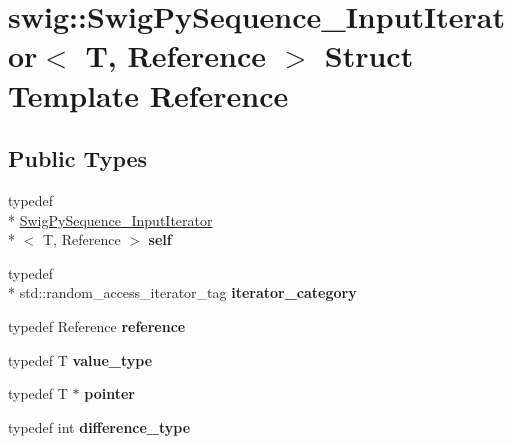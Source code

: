 \hypertarget{structswig_1_1_swig_py_sequence___input_iterator}{\section{swig\-:\-:Swig\-Py\-Sequence\-\_\-\-Input\-Iterator$<$ T, Reference $>$ Struct Template Reference}
\label{structswig_1_1_swig_py_sequence___input_iterator}
}
\subsection*{Public Types}
\begin{DoxyCompactItemize}
\item 
\hypertarget{structswig_1_1_swig_py_sequence___input_iterator_a3d3f028d1d9af412c61de2b5d8630321}{typedef \\*
\hyperlink{structswig_1_1_swig_py_sequence___input_iterator}{Swig\-Py\-Sequence\-\_\-\-Input\-Iterator}\\*
$<$ T, Reference $>$ {\bfseries self}}\label{structswig_1_1_swig_py_sequence___input_iterator_a3d3f028d1d9af412c61de2b5d8630321}

\item 
\hypertarget{structswig_1_1_swig_py_sequence___input_iterator_a39f1b5afee549aeb2f87c854c41be9c1}{typedef \\*
std\-::random\-\_\-access\-\_\-iterator\-\_\-tag {\bfseries iterator\-\_\-category}}\label{structswig_1_1_swig_py_sequence___input_iterator_a39f1b5afee549aeb2f87c854c41be9c1}

\item 
\hypertarget{structswig_1_1_swig_py_sequence___input_iterator_a75f82d558aaa6781b77d34914eb0f455}{typedef Reference {\bfseries reference}}\label{structswig_1_1_swig_py_sequence___input_iterator_a75f82d558aaa6781b77d34914eb0f455}

\item 
\hypertarget{structswig_1_1_swig_py_sequence___input_iterator_ad7b3ca8f977dda776f80b7c2099cae2f}{typedef T {\bfseries value\-\_\-type}}\label{structswig_1_1_swig_py_sequence___input_iterator_ad7b3ca8f977dda776f80b7c2099cae2f}

\item 
\hypertarget{structswig_1_1_swig_py_sequence___input_iterator_ab026efc65329dff4b7af149da037209b}{typedef T $\ast$ {\bfseries pointer}}\label{structswig_1_1_swig_py_sequence___input_iterator_ab026efc65329dff4b7af149da037209b}

\item 
\hypertarget{structswig_1_1_swig_py_sequence___input_iterator_af5e5d3f2d1906ceaf05c2215ee388096}{typedef int {\bfseries difference\-\_\-type}}\label{structswig_1_1_swig_py_sequence___input_iterator_af5e5d3f2d1906ceaf05c2215ee388096}

\end{DoxyCompactItemize}
